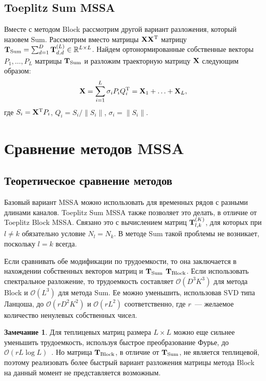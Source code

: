 \documentclass[specialist,
substylefile = spbu_report.rtx,
subf,href,colorlinks=true, 12pt]{disser}
\theoremstyle{definition}
\newtheorem{remark}{Замечание}
\newcommand{\R}{\mathbb{R}}
\begin{document}
\subsection{Toeplitz Sum MSSA}\label{sect:sum}
Вместе с методом Block рассмотрим другой вариант разложения, который назовем Sum. Рассмотрим вместо матрицы $\mathbf{X}\mathbf{X}^{\mathrm{T}}$ матрицу $\bfT_{\text{Sum}}=\sum_{d=1}^D \bfT_{d,d}^{(L)}\in\R^{L\times L}$. Найдем ортонормированные собственные векторы $P_1,\ldots,P_L$ матрицы $\mathbf{T}_{\text{Sum}}$ и разложим траекторную матрицу $\mathbf{X}$ следующим образом:
\begin{equation}\label{eq:sum_decomposition}
	\mathbf{X}=\sum_{i=1}^L\sigma_i P_iQ_i^{\mathrm{T}}=\mathbf{X}_1+\ldots+\mathbf{X}_L,
\end{equation}
где $S_i=\mathbf{X}^{\mathrm{T}} P_i$, $Q_i=S_i/\|S_i\|$, $\sigma_i=\|S_i\|$.

\section{Сравнение методов MSSA}\label{sect:mssa_comparison}
\subsection{Теоретическое сравнение методов}
Базовый вариант MSSA можно использовать для временных рядов с разными длинами каналов. Toeplitz Sum MSSA также позволяет это делать, в отличие от Toeplitz Block MSSA. Связано это с вычислением матриц $\mathbf{T}_{l,k}^{(K)}$, для которых при $l\ne k$ обязательно условие $N_l=N_k$. В методе Sum такой проблемы не возникает, поскольку $l=k$ всегда.

Если сравнивать обе модификации по трудоемкости, то она заключается в нахождении собственных векторов матриц и $\mathbf{T}_{\text{Sum}}$ $\mathbf{T}_{\text{Block}}$. Если использовать спектральное разложение, то трудоемкость составляет $\mathcal{O}(D^3K^3)$ для метода Block и $\mathcal{O}(L^3)$ для метода Sum. Ее можно уменьшить, использовав SVD типа Ланцоша, до $\mathcal{O}(rD^2K^2)$ и $\mathcal{O}(rL^2)$ соответственно, где $r$~--- желаемое количество ненулевых собственных чисел.
\begin{remark}\label{remark:mssa_complexity}
	Для теплицевых матриц размера $L\times L$ можно еще сильнее уменьшить трудоемкость, используя быстрое преобразование Фурье, до $\mathcal{O}(r L\log L)$~\cite{korobeynikov2010computation}. Но матрица $\mathbf{T}_{\text{Block}}$, в отличие от $\mathbf{T}_{\text{Sum}}$, не является теплицевой, поэтому реализовать более быстрый вариант разложения матрицы метода Block на данный момент не представляется возможным.
\end{remark}
\end{document}
